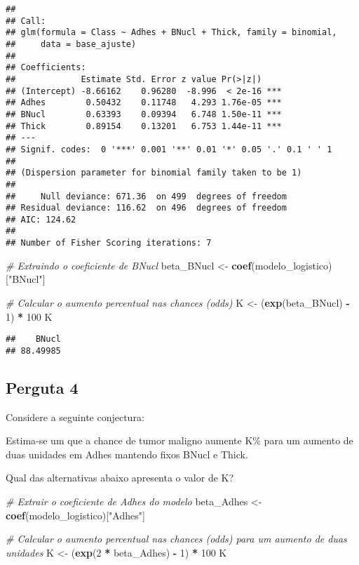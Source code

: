 \documentclass[
]{article}
\newenvironment{Shaded}{\begin{snugshade}}{\end{snugshade}}
\newcommand{\CommentTok}[1]{\textcolor[rgb]{0.56,0.35,0.01}{\textit{#1}}}
\newcommand{\DecValTok}[1]{\textcolor[rgb]{0.00,0.00,0.81}{#1}}
\newcommand{\FunctionTok}[1]{\textcolor[rgb]{0.13,0.29,0.53}{\textbf{#1}}}
\newcommand{\NormalTok}[1]{#1}
\newcommand{\OtherTok}[1]{\textcolor[rgb]{0.56,0.35,0.01}{#1}}
\newcommand{\SpecialCharTok}[1]{\textcolor[rgb]{0.81,0.36,0.00}{\textbf{#1}}}
\newcommand{\StringTok}[1]{\textcolor[rgb]{0.31,0.60,0.02}{#1}}
\begin{document}
\begin{verbatim}
## 
## Call:
## glm(formula = Class ~ Adhes + BNucl + Thick, family = binomial, 
##     data = base_ajuste)
## 
## Coefficients:
##             Estimate Std. Error z value Pr(>|z|)    
## (Intercept) -8.66162    0.96280  -8.996  < 2e-16 ***
## Adhes        0.50432    0.11748   4.293 1.76e-05 ***
## BNucl        0.63393    0.09394   6.748 1.50e-11 ***
## Thick        0.89154    0.13201   6.753 1.44e-11 ***
## ---
## Signif. codes:  0 '***' 0.001 '**' 0.01 '*' 0.05 '.' 0.1 ' ' 1
## 
## (Dispersion parameter for binomial family taken to be 1)
## 
##     Null deviance: 671.36  on 499  degrees of freedom
## Residual deviance: 116.62  on 496  degrees of freedom
## AIC: 124.62
## 
## Number of Fisher Scoring iterations: 7
\end{verbatim}

\begin{Shaded}
\begin{Highlighting}[]
\CommentTok{\# Extraindo o coeficiente de BNucl}
\NormalTok{beta\_BNucl }\OtherTok{\textless{}{-}} \FunctionTok{coef}\NormalTok{(modelo\_logistico)[}\StringTok{"BNucl"}\NormalTok{]}

\CommentTok{\# Calcular o aumento percentual nas chances (odds)}
\NormalTok{K }\OtherTok{\textless{}{-}}\NormalTok{ (}\FunctionTok{exp}\NormalTok{(beta\_BNucl) }\SpecialCharTok{{-}} \DecValTok{1}\NormalTok{) }\SpecialCharTok{*} \DecValTok{100}
\NormalTok{K}
\end{Highlighting}
\end{Shaded}

\begin{verbatim}
##    BNucl 
## 88.49985
\end{verbatim}

\subsection{Perguta 4}\label{perguta-4}

Considere a seguinte conjectura:

Estima-se um que a chance de tumor maligno aumente K\% para um aumento
de duas unidades em Adhes mantendo fixos BNucl e Thick.

Qual das alternativas abaixo apresenta o valor de K?

\begin{Shaded}
\begin{Highlighting}[]
\CommentTok{\# Extrair o coeficiente de Adhes do modelo}
\NormalTok{beta\_Adhes }\OtherTok{\textless{}{-}} \FunctionTok{coef}\NormalTok{(modelo\_logistico)[}\StringTok{"Adhes"}\NormalTok{]}

\CommentTok{\# Calcular o aumento percentual nas chances (odds) para um aumento de duas unidades}
\NormalTok{K }\OtherTok{\textless{}{-}}\NormalTok{ (}\FunctionTok{exp}\NormalTok{(}\DecValTok{2} \SpecialCharTok{*}\NormalTok{ beta\_Adhes) }\SpecialCharTok{{-}} \DecValTok{1}\NormalTok{) }\SpecialCharTok{*} \DecValTok{100}
\NormalTok{K}
\end{Highlighting}
\end{Shaded}
\end{document}
